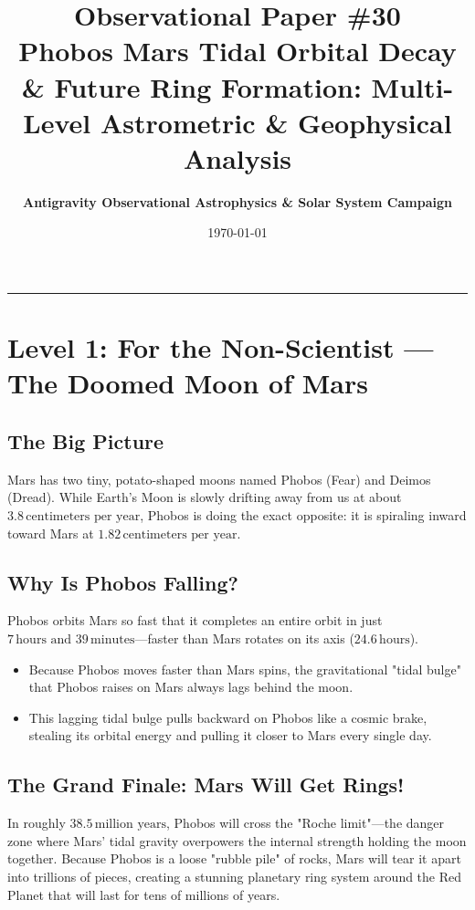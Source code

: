 \documentclass[11pt,a4paper]{article}
\title{\Huge \textbf{Observational Paper \#30}\\ \Large Phobos Mars Tidal Orbital Decay \& Future Ring Formation: Multi-Level Astrometric \& Geophysical Analysis}
\author{\textbf{Antigravity Observational Astrophysics \& Solar System Campaign}}
\date{\today}
\begin{document}
\maketitle

\vspace{-1em}
\begin{center}
\rule{\textwidth}{1.5pt}
\end{center}

\section*{Level 1: For the Non-Scientist — The Doomed Moon of Mars}

\subsection*{The Big Picture}
Mars has two tiny, potato-shaped moons named Phobos (Fear) and Deimos (Dread). While Earth's Moon is slowly drifting away from us at about $3.8\,\text{centimeters per year}$, Phobos is doing the exact opposite: it is spiraling inward toward Mars at $1.82\,\text{centimeters per year}$.

\subsection*{Why Is Phobos Falling?}
Phobos orbits Mars so fast that it completes an entire orbit in just $7\,\text{hours and } 39\,\text{minutes}$—faster than Mars rotates on its axis ($24.6\,\text{hours}$). 
\begin{itemize}
    \item Because Phobos moves faster than Mars spins, the gravitational "tidal bulge" that Phobos raises on Mars always lags behind the moon.
    \item This lagging tidal bulge pulls backward on Phobos like a cosmic brake, stealing its orbital energy and pulling it closer to Mars every single day.
\end{itemize}

\subsection*{The Grand Finale: Mars Will Get Rings!}
In roughly $38.5\,\text{million years}$, Phobos will cross the "Roche limit"—the danger zone where Mars' tidal gravity overpowers the internal strength holding the moon together. Because Phobos is a loose "rubble pile" of rocks, Mars will tear it apart into trillions of pieces, creating a stunning planetary ring system around the Red Planet that will last for tens of millions of years.
\end{document}
